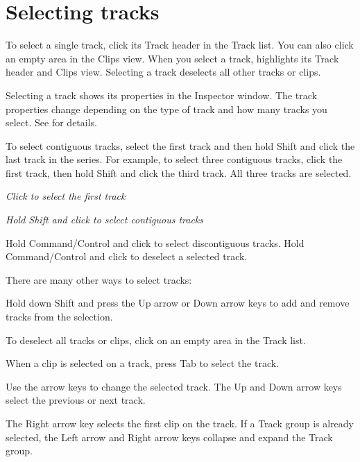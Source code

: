 \chapter{Selecting tracks}
\hypertarget{md__library_2_package_cache_2com_8unity_8timeline_0d1_87_86_2_documentation_0i_2trk__select}{}\label{md__library_2_package_cache_2com_8unity_8timeline_0d1_87_86_2_documentation_0i_2trk__select}
\label{md__library_2_package_cache_2com_8unity_8timeline_0d1_87_86_2_documentation_0i_2trk__select_autotoc_md1263}%
%
 To select a single track, click its Track header in the Track list. You can also click an empty area in the Clips view. When you select a track,  highlights its Track header and Clips view. Selecting a track deselects all other tracks or clips.

Selecting a track shows its properties in the Inspector window. The track properties change depending on the type of track and how many tracks you select. See  for details.

To select contiguous tracks, select the first track and then hold Shift and click the last track in the series. For example, to select three contiguous tracks, click the first track, then hold Shift and click the third track. All three tracks are selected.



{\itshape Click to select the first track}



{\itshape Hold Shift and click to select contiguous tracks}

Hold Command/\+Control and click to select discontiguous tracks. Hold Command/\+Control and click to deselect a selected track.

There are many other ways to select tracks\+:


\begin{DoxyItemize}
\item Hold down Shift and press the Up arrow or Down arrow keys to add and remove tracks from the selection.
\item To deselect all tracks or clips, click on an empty area in the Track list.
\item When a clip is selected on a track, press Tab to select the track.
\item Use the arrow keys to change the selected track. The Up and Down arrow keys select the previous or next track.
\item The Right arrow key selects the first clip on the track. If a Track group is already selected, the Left arrow and Right arrow keys collapse and expand the Track group. 
\end{DoxyItemize}